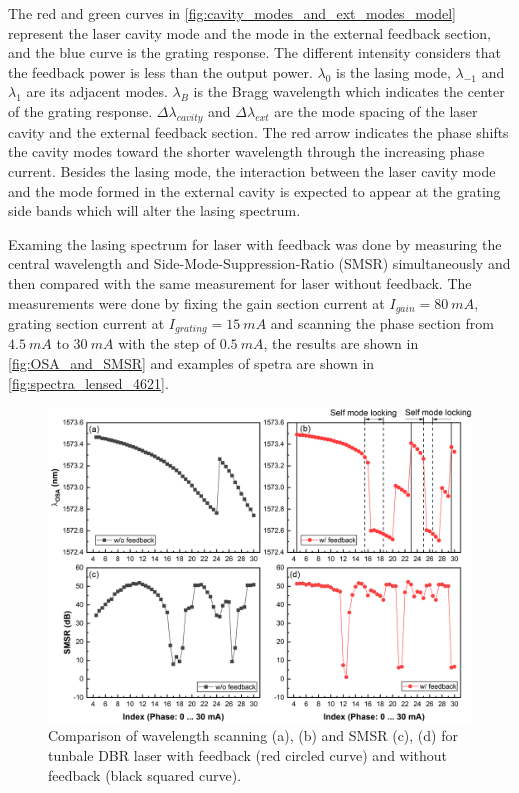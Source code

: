 The red and green curves in \autoref{fig:cavity_modes_and_ext_modes_model} represent the laser cavity mode and the mode in the external feedback section, and the blue curve is the grating response. The different intensity considers that the feedback power is less than the output power. $\lambda_0$ is the lasing mode, $\lambda_{-1}$ and $\lambda_{1}$ are its adjacent modes. $\lambda_B$ is the Bragg wavelength which indicates the center of the grating response. $\Delta\lambda_{cavity}$ and $\Delta\lambda_{ext}$ are the mode spacing of the laser cavity and the external feedback section. The red arrow indicates the phase shifts the cavity modes toward the shorter wavelength through the increasing phase current. Besides the lasing mode, the interaction between the laser cavity mode and the mode formed in the external cavity is expected to appear at the grating side bands which will alter the lasing spectrum.

Examing the lasing spectrum for laser with feedback was done by measuring the central wavelength and Side-Mode-Suppression-Ratio (SMSR) simultaneously and then compared with the same measurement for laser without feedback. The measurements were done by fixing the gain section current at $I_{gain}=80 \ mA$, grating section current at $I_{grating}=15 \ mA$ and scanning the phase section from $4.5 \ mA$ to $30 \ mA$ with the step of $0.5 \ mA$, the results are shown in \autoref{fig:OSA_and_SMSR} and examples of spetra are shown in \autoref{fig:spectra_lensed_4621}. 

\begin{figure}[ht]
    \centering
    \includegraphics[width=\linewidth]{figures/OSA_and_SMSR.png}
    \caption{Comparison of wavelength scanning (a), (b) and SMSR (c), (d) for tunbale DBR laser with feedback (red circled curve) and without feedback (black squared curve).}
    \label{fig:OSA_and_SMSR}
\end{figure}

